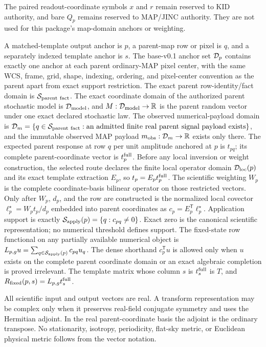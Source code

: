 The paired readout-coordinate symbols $x$ and $r$ remain reserved to KID
authority, and bare $Q_p$ remains reserved to MAP/JINC authority. They are not
used for this package's map-domain anchors or weighting.

A matched-template output anchor is $p$, a parent-map row or pixel is $q$, and
a separately indexed template anchor is $s$. The base-v0.1 anchor set
$\mathcal{D}_p$ contains exactly one anchor at each parent ordinary-MAP pixel center,
with the same WCS, frame, grid, shape, indexing, ordering, and pixel-center
convention as the parent apart from exact support restriction. The exact
parent row-identity/fact domain is $\mathcal{S}_{\rm parent\ fact}$. The exact
coordinate domain of the authorized parent stochastic model is
$\mathcal{D}_{\rm model}$, and
$M:\mathcal{D}_{\rm model}\rightarrow\mathbb{R}$ is the parent random vector under one exact
declared stochastic law. The observed numerical-payload domain is
$\mathcal{D}_m=\{q\in\mathcal{S}_{\rm parent\ fact}:\hbox{an admitted finite real parent
signal payload exists}\}$, and the immutable observed MAP payload
$m_{\rm obs}:\mathcal{D}_m\rightarrow\mathbb{R}$ exists only there.
The expected parent response at row $q$ per unit
amplitude anchored at $p$ is $t_{pq}$; its complete parent-coordinate vector is
$t_p^{\rm full}$. Before any local inversion or weight construction, the
selected route declares the finite local operator domain $\mathcal{D}_{\rm loc}(p)$
and its exact template extraction $E_p$, so $t_p=E_pt_p^{\rm full}$.
The scientific weighting $W_p$ is the complete coordinate-basis bilinear
operator on those restricted vectors. Only after $W_p$, $d_p$, and the row are
constructed is the normalized local covector
$\ell_p^\star=W_pt_p/d_p$ embedded into parent coordinates as
$c_p=E_p^{\mathsf T}\ell_p^\star$. Application support is exactly
$\mathcal{S}_{\rm apply}(p)=\{q:c_{pq}\ne0\}$. Exact zero is the canonical
scientific representation; no numerical threshold defines support. The
fixed-state row functional on any partially available numerical object is
$L_{p,g}u=\sum_{q\in\mathcal{S}_{\rm apply}(p)}c_{pq}u_q$. The dense shorthand
$c_p^{\mathsf T}u$ is allowed only when $u$ exists on the complete parent
coordinate domain or an exact algebraic completion is proved irrelevant.
The template matrix whose column $s$ is $t_s^{\rm full}$ is $T$,
and $R_{\rm fixed}(p,s)=L_{p,g}t_s^{\rm full}$.

All scientific input and output vectors are real. A transform representation
may be complex only when it preserves real-field conjugate symmetry and uses
the Hermitian adjoint. In the real parent-coordinate basis the adjoint is the
ordinary transpose. No stationarity, isotropy, periodicity, flat-sky metric,
or Euclidean physical metric follows from the vector notation.

